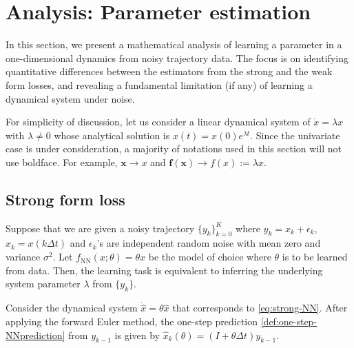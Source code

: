 \documentclass[final]{siamltex}
\newcommand{\bfa}[1]{\boldsymbol{#1}}
\begin{document}






\section{Analysis: Parameter estimation}\label{sec:analysis}
In this section, we present a mathematical analysis of learning a parameter in a one-dimensional dynamics from noisy trajectory data.
The focus is on identifying quantitative differences between the estimators from the strong and the weak form losses, and revealing a fundamental limitation (if any) of learning a dynamical system under noise.


For simplicity of discussion, let us consider a linear dynamical system of 
$\dot{x}=\lambda x$ with $\lambda \ne 0$ whose analytical solution is $x(t) = x(0)e^{\lambda t}$.
Since the univariate case is under consideration, a majority of notations used in this section will not use boldface.
For example, $\bfa{x} \to x$ and $\bfa{f}(\bfa{x}) \to f(x):=\lambda x$.



\subsection{Strong form loss}
Suppose that we are given a noisy trajectory $\{y_k\}_{k=0}^K$ where $y_k = x_k + \epsilon_k$, $x_k = x(k\Delta t)$ and $\epsilon_k$'s are independent random noise with mean zero and variance $\sigma^2$.
Let $f_\text{NN}(x;\theta) = \theta x$ be the model of choice where $\theta$ is to be learned from data.
Then, the learning task is equivalent to inferring the underlying system parameter $\lambda$ from $\{y_k\}$.

Consider the dynamical system $\dot{\widehat{x}}=\theta\widehat{x}$ that corresponds to \eqref{eq:strong-NN}.
After applying the forward Euler method, the one-step prediction \eqref{def:one-step-NNprediction} from $y_{k-1}$ is given by $\widehat{x}_k(\theta) = (I+\theta\Delta t) y_{k-1}$.
\end{document}
